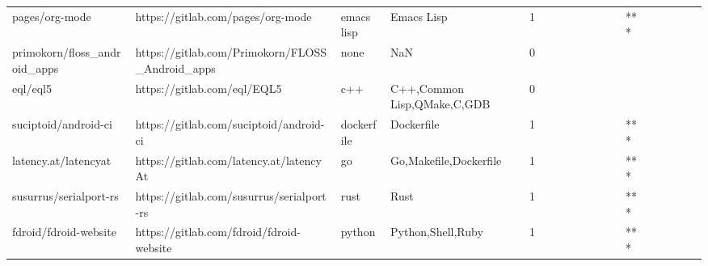 \begin{tabular}{llllrlllllllllllll}
pages/org-mode                                     &                  https://gitlab.com/pages/org-mode &        emacs lisp &                                         Emacs Lisp &       1 &         &        &           &                &                 &        &           &       *** &          &          &       &              &          \\
primokorn/floss\_android\_apps                       &    https://gitlab.com/Primokorn/FLOSS\_Android\_apps &              none &                                                NaN &       0 &         &        &           &                &                 &        &           &           &          &          &       &              &          \\
eql/eql5                                           &                        https://gitlab.com/eql/EQL5 &               c++ &                        C++,Common Lisp,QMake,C,GDB &       0 &         &        &           &                &                 &        &           &           &          &          &       &              &          \\
suciptoid/android-ci                               &            https://gitlab.com/suciptoid/android-ci &        dockerfile &                                         Dockerfile &       1 &         &        &           &                &                 &        &           &       *** &          &          &       &              &          \\
latency.at/latencyat                               &            https://gitlab.com/latency.at/latencyAt &                go &                             Go,Makefile,Dockerfile &       1 &         &        &           &                &                 &        &           &       *** &          &          &       &              &          \\
susurrus/serialport-rs                             &          https://gitlab.com/susurrus/serialport-rs &              rust &                                               Rust &       1 &         &        &           &                &                 &        &           &       *** &          &          &       &              &          \\
fdroid/fdroid-website                              &           https://gitlab.com/fdroid/fdroid-website &            python &                                  Python,Shell,Ruby &       1 &         &        &           &                &                 &        &           &       *** &          &          &       &              &          \\

\end{tabular}
